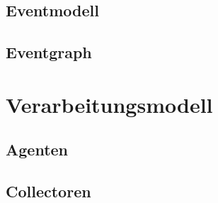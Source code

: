 \subsection{Eventmodell}
\label{subsection:Eventmodell}
\subsection{Eventgraph}
\label{subsection:Eventgraph}
\section{Verarbeitungsmodell}
\label{section:Verarbeitungsmodell}
\subsection{Agenten}
\label{subsection:Agenten}
\subsection{Collectoren}
\label{subsection:Collectoren}

